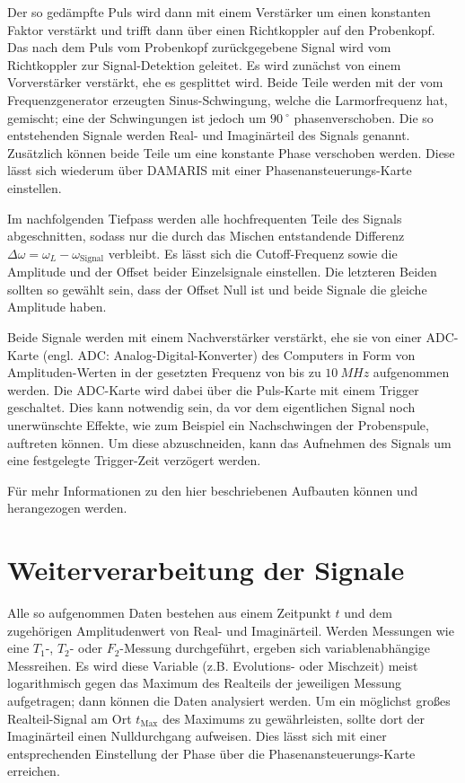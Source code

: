Der so gedämpfte Puls wird dann mit einem Verstärker um einen konstanten Faktor verstärkt und trifft dann über einen Richtkoppler auf den Probenkopf. Das nach dem Puls vom Probenkopf zurückgegebene Signal wird vom Richtkoppler zur Signal-Detektion geleitet. Es wird zunächst von einem Vorverstärker verstärkt, ehe es gesplittet wird. Beide Teile werden mit der vom Frequenzgenerator erzeugten Sinus-Schwingung, welche die Larmorfrequenz hat, gemischt; eine der Schwingungen ist jedoch um $\SI{90}{^\circ}$ phasenverschoben. Die so entstehenden Signale werden Real- und Imaginärteil des Signals genannt. Zusätzlich können beide Teile um eine konstante Phase verschoben werden. Diese lässt sich wiederum über DAMARIS mit einer Phasenansteuerungs-Karte einstellen.

Im nachfolgenden Tiefpass werden alle hochfrequenten Teile des Signals abgeschnitten, sodass nur die durch das Mischen entstandende Differenz $\Delta \omega = \omega_L - \omega_\text{Signal}$ verbleibt. Es lässt sich die Cutoff-Frequenz sowie die Amplitude und der Offset beider Einzelsignale einstellen. Die letzteren Beiden sollten so gewählt sein, dass der Offset Null ist und beide Signale die gleiche Amplitude haben.


Beide Signale werden mit einem Nachverstärker verstärkt, ehe sie von einer ADC-Karte (engl. ADC: Analog-Digital-Konverter) des Computers in Form von Amp\-li\-tu\-den-Wer\-ten in der gesetzten Frequenz von bis zu $\SI{10}{MHz}$ aufgenommen werden. Die ADC-Karte wird dabei über die Puls-Karte mit einem Trigger geschaltet. Dies kann notwendig sein, da vor dem eigentlichen Signal noch unerwünschte Effekte, wie zum Beispiel ein Nachschwingen der Probenspule, auftreten können. Um diese abzuschneiden, kann das Aufnehmen des Signals um eine festgelegte Trigger-Zeit verzögert werden.

Für mehr Informationen zu den hier beschriebenen Aufbauten können \cite{lueg_implementierung_2016} und \cite{tilly_master} herangezogen werden.



\section{Weiterverarbeitung der Signale} \label{section:exp:weiterverarbeitung}

Alle so aufgenommen Daten bestehen aus einem Zeitpunkt $t$ und dem zugehörigen Amplitudenwert von Real- und Imaginärteil. Werden Messungen wie eine $T_1$-, $T_2$- oder $F_2$-Messung durchgeführt, ergeben sich variablenabhängige Messreihen. Es wird diese Variable (z.B. Evolutions- oder Mischzeit) meist logarithmisch gegen das Maximum des Realteils der jeweiligen Messung aufgetragen; dann können die Daten analysiert werden. Um ein möglichst großes Realteil-Signal am Ort $t_\text{Max}$ des Maximums zu gewährleisten, sollte dort der Imaginärteil einen Nulldurchgang aufweisen. Dies lässt sich mit einer entsprechenden Einstellung der Phase über die Phasenansteuerungs-Karte erreichen.

